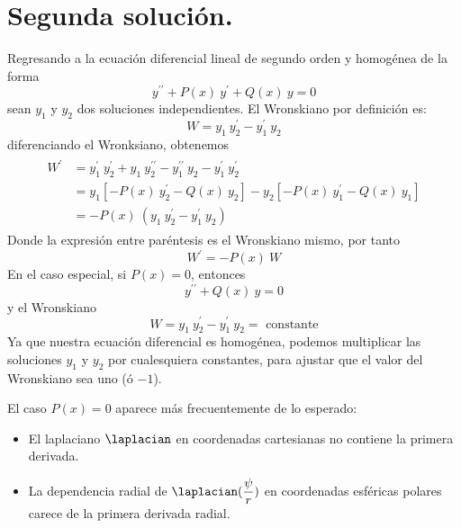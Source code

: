 \section{Segunda solución.}
Regresando a la ecuación diferencial lineal de segundo orden y homogénea de la forma
\begin{equation}
y^{\prime \prime} + P(x) \: y^{\prime} + Q(x) \: y = 0
\label{eq:ecuacion_09_118}
\end{equation}
sean $y_{1}$ y $y_{2}$ dos soluciones independientes. El Wronskiano por definición es:
\begin{equation}
W = y_{1} \: y^{\prime}_{2} - y^{\prime}_{1} \: y_{2}
\label{eq:ecuacion_09_119}
\end{equation}
diferenciando el Wronksiano, obtenemos
\begin{align}
\begin{aligned}
W^{\prime} &= y^{\prime}_{1} \: y_{2}^{\prime} + y_{1} \: y^{\prime \prime}_{2} - y^{\prime \prime}_{1} \: y_{2} - y^{\prime}_{1} \: y^{\prime}_{2} \\
&= y_{1} [ - P(x) \: y^{\prime}_{2} - Q(x) \: y_{2}] - y_{2} [ - P(x) \: y^{\prime}_{1} - Q(x)  \: y_{1}] \\
&= - P(x) \: (y_{1} \: y^{\prime}_{2} - y^{\prime}_{1} \: y_{2})
\end{aligned}
\end{align}
Donde la expresión entre paréntesis es el Wronskiano mismo, por tanto
\begin{equation}
W^{\prime} = - P(x) \: W
\label{eq:ecuacion_09_120}
\end{equation}
En el caso especial, si $P(x) = 0$, entonces
\begin{equation}
y^{\prime \prime} + Q(x) \: y = 0
\label{eq:ecuacion_09_121}
\end{equation}
y el Wronskiano
\begin{equation}
W = y_{1} \: y^{\prime}_{2} - y^{\prime}_{1} \: y_{2} = \mbox{ constante}
\label{eq:ecuacion_09_1202}
\end{equation}
Ya que nuestra ecuación diferencial es homogénea, podemos multiplicar las soluciones $y_{1}$ y $y_{2}$ por cualesquiera constantes, para ajustar que el valor del Wronskiano sea uno (ó $-1$).
\par
El caso $P(x) = 0$ aparece más frecuentemente de lo esperado:
\begin{itemize}
\item El laplaciano $\laplacian$ en coordenadas cartesianas no contiene la primera derivada.
\item La dependencia radial de $\laplacian (\dfrac{\psi}{r})$ en coordenadas esféricas polares carece de la primera derivada radial.
\end{itemize}
